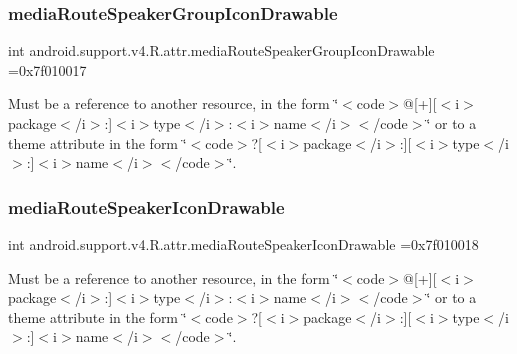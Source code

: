 \subsubsection{\texorpdfstring{media\+Route\+Speaker\+Group\+Icon\+Drawable}{mediaRouteSpeakerGroupIconDrawable}}
{\footnotesize\ttfamily int android.\+support.\+v4.\+R.\+attr.\+media\+Route\+Speaker\+Group\+Icon\+Drawable =0x7f010017\hspace{0.3cm}{\ttfamily [static]}}

Must be a reference to another resource, in the form \char`\"{}$<$code$>$@\mbox{[}+\mbox{]}\mbox{[}$<$i$>$package$<$/i$>$\+:\mbox{]}$<$i$>$type$<$/i$>$\+:$<$i$>$name$<$/i$>$$<$/code$>$\char`\"{} or to a theme attribute in the form \char`\"{}$<$code$>$?\mbox{[}$<$i$>$package$<$/i$>$\+:\mbox{]}\mbox{[}$<$i$>$type$<$/i$>$\+:\mbox{]}$<$i$>$name$<$/i$>$$<$/code$>$\char`\"{}. \mbox{\label{classandroid_1_1support_1_1v4_1_1R_1_1attr_a6c046be1d80e71de6815589ce8e9c033}} 
\subsubsection{\texorpdfstring{media\+Route\+Speaker\+Icon\+Drawable}{mediaRouteSpeakerIconDrawable}}
{\footnotesize\ttfamily int android.\+support.\+v4.\+R.\+attr.\+media\+Route\+Speaker\+Icon\+Drawable =0x7f010018\hspace{0.3cm}{\ttfamily [static]}}

Must be a reference to another resource, in the form \char`\"{}$<$code$>$@\mbox{[}+\mbox{]}\mbox{[}$<$i$>$package$<$/i$>$\+:\mbox{]}$<$i$>$type$<$/i$>$\+:$<$i$>$name$<$/i$>$$<$/code$>$\char`\"{} or to a theme attribute in the form \char`\"{}$<$code$>$?\mbox{[}$<$i$>$package$<$/i$>$\+:\mbox{]}\mbox{[}$<$i$>$type$<$/i$>$\+:\mbox{]}$<$i$>$name$<$/i$>$$<$/code$>$\char`\"{}. \mbox{\label{classandroid_1_1support_1_1v4_1_1R_1_1attr_ab5014dab3a8b837aa988a3f15246fc9d}} 
